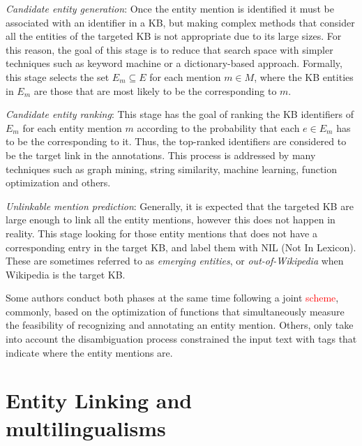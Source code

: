 \documentclass{llncs}
\begin{document}
\begin{description}
\item \textit{Candidate entity generation}:
Once the entity mention is identified it must be associated with an identifier in a KB, but making complex methods that consider all the entities of the targeted KB is not appropriate due to its large sizes. For this reason, the goal of this stage is to reduce that search space with simpler techniques such as keyword machine or a dictionary-based approach. Formally,  this stage selects the set $E_m \subseteq E$ for each mention $m\in{}M$, where the KB entities in $E_m$ are those that are most likely to be the corresponding to $m$. 

\item \textit{Candidate entity ranking}: 
This stage has the goal of ranking the KB identifiers of $E_m$ for each entity mention $m$ according to the probability that each $e\in{}E_m$ has to be the corresponding to it. Thus, the top-ranked identifiers are considered to be the target link in the annotations. This process is addressed by many techniques such as graph mining, string similarity, machine learning, function optimization and others.

\item \textit{Unlinkable mention prediction}: 
Generally, it is expected that the targeted KB are large enough to link all the entity mentions, however this does not happen in reality. This stage looking for those entity mentions that does not have a corresponding entry in the target KB, and label them with NIL (Not In Lexicon). These are sometimes referred to as \textit{emerging entities}, or \textit{out-of-Wikipedia} when Wikipedia is the target KB.  
\end{description}

Some authors conduct both phases at the same time following a joint \textcolor{red}{scheme}, commonly, based on the optimization of functions that simultaneously measure the feasibility of recognizing and annotating an entity mention. Others, only take into account the disambiguation process constrained the input text with tags that indicate where the entity mentions are. 



\section{Entity Linking and multilingualisms}
\end{document}
